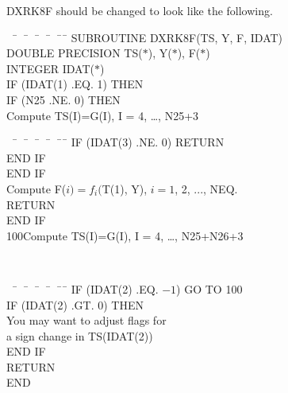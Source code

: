 \documentclass[twoside]{MATH77}
\begin{document}
DXRK8F should be changed to look like the following.\vspace{-5pt}
{\tt \begin{tabbing}
\phantom{100}\ \=\ \ \=\ \ \=\ \ \=\ \ \=\ \ \=\kill
\>SUBROUTINE DXRK8F(TS, Y, F, IDAT)\\
\>DOUBLE PRECISION TS($\ast$), Y($\ast$), F($\ast$)\\
\>INTEGER IDAT($\ast$)\\
\>IF (IDAT(1) .EQ. 1) THEN\\
\>\>IF (N25 .NE. 0) THEN\\
\>\>\>Compute TS(I)=G(I), I = 4, \ldots, N25+3\\
\end{tabbing}}\vspace{-22pt}
\qquad \qquad {}\vspace{-10pt}
{\tt \begin{tabbing}
\phantom{100}\ \=\ \ \=\ \ \=\ \ \=\ \ \=\ \ \=\kill
\>\>\>\>IF (IDAT(3) .NE. 0) RETURN\\
\>\>\>END IF\\
\>\>END IF\\
\>\>Compute F($i)=f_i($T(1), Y), $i = 1$, 2, ..., NEQ.\\
\>\>RETURN\\
\>END IF\\
100\>Compute TS(I)=G(I), I = 4, \ldots, N25+N26+3\rule[-8pt]{0pt}{8pt}\\
\end{tabbing}}\vspace{-26pt}
\qquad {}\vspace{-10pt}
{\tt \begin{tabbing}
\phantom{100}\ \=\ \ \=\ \ \=\ \ \=\ \ \=\ \ \=\kill
\>IF (IDAT(2) .EQ. $-1$) GO TO 100\\
\>IF (IDAT(2) .GT. 0) THEN\\
\>\>You may want to adjust flags for\\
\>\>a sign change in TS(IDAT(2))\\
\>END IF\\
\>RETURN\\
\>END
\end{tabbing}}\vspace{-10pt}
\end{document}
